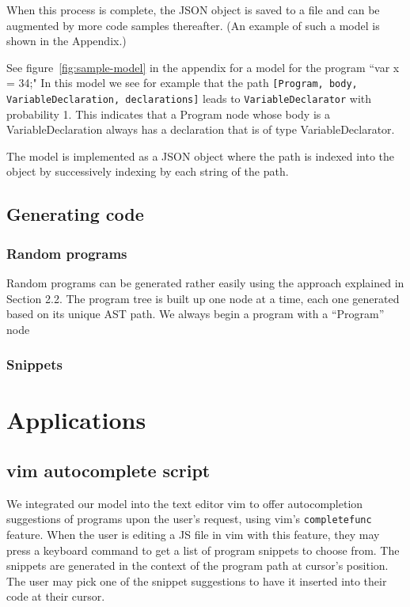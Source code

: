 \documentclass{article}
\begin{document}
When this process is complete, the JSON object is saved to a file and can be augmented by more code samples thereafter. (An example of such a model is shown in the Appendix.)

See figure~\ref{fig:sample-model} in the appendix for a model for the program
``var x = 34;" In this model we see for example that the path
\texttt{[Program, body, VariableDeclaration, declarations]} leads to
\texttt{VariableDeclarator} with probability 1. This indicates that a Program
node whose body is a VariableDeclaration always has a declaration that is of
type VariableDeclarator.

The model is implemented as a JSON object where the path is indexed into the
object by successively indexing by each string of the path.


\subsection{Generating code}

\subsubsection{Random programs}

Random programs can be generated rather easily using the approach explained in Section 2.2. The program tree is built up one node at a time, each one generated based on its unique AST path. We always begin a program with a ``Program'' node

\subsubsection{Snippets}



%

\section{Applications}

\subsection{vim autocomplete script}

We integrated our model into the text editor vim to offer autocompletion
suggestions of programs upon the user's request, using vim's
\texttt{completefunc} feature. When the user is editing a JS file in vim with
this feature, they may press a keyboard command to get a list of program
snippets to choose from. The snippets are generated in the context of the
program path at cursor's position. The user may pick one of the snippet
suggestions to have it inserted into their code at their cursor.
\end{document}
